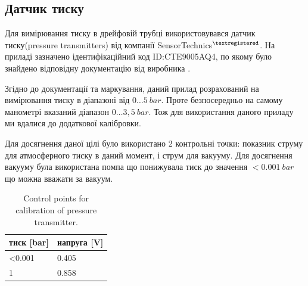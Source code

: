 \documentclass[pdftex,14pt]{scrartcl}
\begin{document}
\begin{spacing}{1.5}
\subsection{Датчик тиску}

	
	
	
	Для вимірювання тиску в дрейфовій трубці використовувався датчик тиску(pressure transmitters) від компанії SensorTechnics$^{\textregistered}$. На приладі зазначено ідентифікаційний код ID:CTE9005AQ4, по якому було знайдено відповідну документацію від виробника \cite{presTransmitDatasheet}.

	Згідно до документації та маркування, даний прилад розрахований на вимірювання тиску в діапазоні від $0 \dots 5~bar$. Проте безпосередньо на самому манометрі вказаний діапазон $0\dots 3,5~bar$. Тож для використання даного приладу ми вдалися до додаткової калібровки.
	
	Для досягнення даної цілі було використано 2 контрольні точки: показник струму для атмосферного тиску в даний момент, і струм для вакууму. Для досягнення вакууму була використана помпа що понижувала тиск до значення $<0.001~bar$ що можна вважати за вакуум.
	
	\begin{table}[!h]
	\centering
	\caption{ Control points for calibration of pressure transmitter.}
	\begin{tabular}{|l|l|}
		\hline
		тиск [bar] & напруга [V] \\
		\hline
		<0.001 & 0.405\\
		\hline
		1 & 0.858\\
		\hline
	\end{tabular}
	\end{table}
	

\end{spacing}
\end{document}
